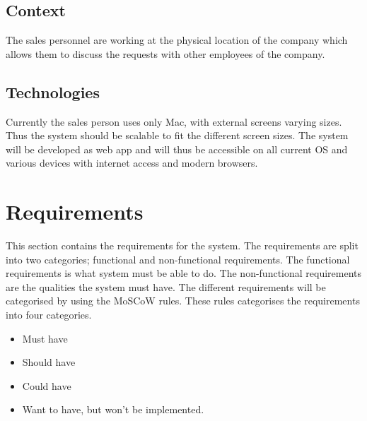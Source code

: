 \subsection{Context}
The sales personnel are working at the physical location of the company which allows them to discuss the requests with other employees of the company. 

\subsection{Technologies}
Currently the sales person uses only Mac, with external screens varying sizes. Thus the system should be scalable to fit the different screen sizes. The system will be developed as web app and will thus be accessible on all current OS and various devices with internet access and modern browsers. 


\section{Requirements}
This section contains the requirements for the system. The requirements are split into two categories; functional and non-functional requirements. The functional requirements is what system must be able to do. The non-functional requirements are the qualities the system must have. The different requirements will be categorised by using the MoSCoW rules. These rules categorises the requirements into four categories. 

\begin{itemize}
    \item Must have
    \item Should have
    \item Could have
    \item Want to have, but won't be implemented. 
\end{itemize}

